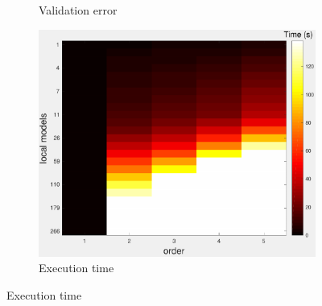 \documentclass[letterpaper, 10 pt, conference]{ieeeconf}  %
\begin{document}
\begin{figure}[htpb]
\begin{subfigure}[b]{1in}
                \caption{Validation error}
                \label{fig:crossval_train}
        \end{subfigure}
                \begin{subfigure}[b]{1in} 
                \centering
                \includegraphics[width=\textwidth]{figures/cross_allQP3.pdf}
                \caption{Execution time}
                \label{fig:crossval_train}
        \end{subfigure}
\end{figure}
\blindtext[1]
\end{document}

